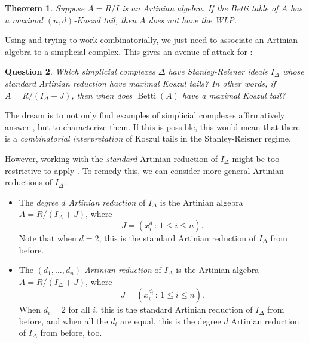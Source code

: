 \documentclass[12pt,a4paper]{article}
\DeclareMathOperator{\Betti}{Betti}
\newtheorem{theorem}{Theorem}[section]
\newtheorem{question}[theorem]{Question}
\theoremstyle{definition}
\numberwithin{equation}{section}
\begin{document}
\begin{theorem}{\cite[Theorem~2]{grate_betti_2024}}\label{theorem:grate-schenck}
    Suppose $A = R/I$ is an Artinian algebra.
    If the Betti table of $A$ has a maximal $(n,d)$-Koszul tail, then $A$ does not have the WLP.
\end{theorem}

Using  and trying to work combinatorially, we just need to associate an Artinian algebra to a simplicial complex.
This gives an avenue of attack for :

\begin{question}\label{question:simplicial complexes koszul tails}
    Which simplicial complexes $\Delta$ have Stanley-Reisner ideals $I_\Delta$ whose standard Artinian reduction have maximal Koszul tails?
    In other words, if $A = R / (I_\Delta + J)$, then when does $\Betti(A)$ have a maximal Koszul tail?
\end{question}

The dream is to not only find examples of simplicial complexes affirmatively answer , but to characterize them.
If this is possible, this would mean that there is a \emph{combinatorial interpretation} of Koszul tails in the Stanley-Reisner regime.

However, working with the \emph{standard} Artinian reduction of $I_\Delta$ might be too restrictive to apply .
To remedy this, we can consider more general Artinian reductions of $I_\Delta$:
\begin{itemize}
    \item The \emph{degree $d$ Artinian reduction} of $I_\Delta$ is the Artinian algebra $A = R / (I_\Delta + J)$, where
    \begin{equation*}
        J = (x_i^d \, \colon \, 1 \leq i \leq n).
    \end{equation*}
    Note that when $d=2$, this is the standard Artinian reduction of $I_\Delta$ from before.

    \item The \emph{$(d_1,\dots,d_n)$-Artinian reduction} of $I_\Delta$ is the Artinian algebra $A = R / (I_\Delta + J)$, where
    \begin{equation*}
        J = (x_i^{d_i} \, \colon \, 1 \leq i \leq n).
    \end{equation*}
    When $d_i=2$ for all $i$, this is the standard Artinian reduction of $I_\Delta$ from before, and when all the $d_i$ are equal, this is the degree $d$ Artinian reduction of $I_\Delta$ from before, too.
\end{itemize}
\end{document}
